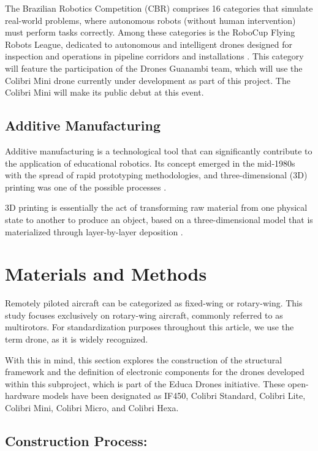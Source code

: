 \documentclass[conference]{IEEEtran}
\begin{document}
The Brazilian Robotics Competition (CBR) comprises 16 categories that simulate real-world problems, where autonomous robots (without human intervention) must perform tasks correctly. Among these categories is the RoboCup Flying Robots League, dedicated to autonomous and intelligent drones designed for inspection and operations in pipeline corridors and installations \cite{b3}. This category will feature the participation of the Drones Guanambi team, which will use the Colibri Mini drone currently under development as part of this project. The Colibri Mini will make its public debut at this event.

\subsection{Additive Manufacturing}

Additive manufacturing is a technological tool that can significantly contribute to the application of educational robotics. Its concept emerged in the mid-1980s with the spread of rapid prototyping methodologies, and three-dimensional (3D) printing was one of the possible processes \cite{b10}.

3D printing is essentially the act of transforming raw material from one physical state to another to produce an object, based on a three-dimensional model that is materialized through layer-by-layer deposition \cite{b8}.

\section{Materials and Methods}

Remotely piloted aircraft can be categorized as fixed-wing or rotary-wing. This study focuses exclusively on rotary-wing aircraft, commonly referred to as multirotors. For standardization purposes throughout this article, we use the term drone, as it is widely recognized.

With this in mind, this section explores the construction of the structural framework and the definition of electronic components for the drones developed within this subproject, which is part of the Educa Drones initiative. These open-hardware models have been designated as IF450, Colibri Standard, Colibri Lite, Colibri Mini, Colibri Micro, and Colibri Hexa.

\subsection{Construction Process:}
\end{document}
